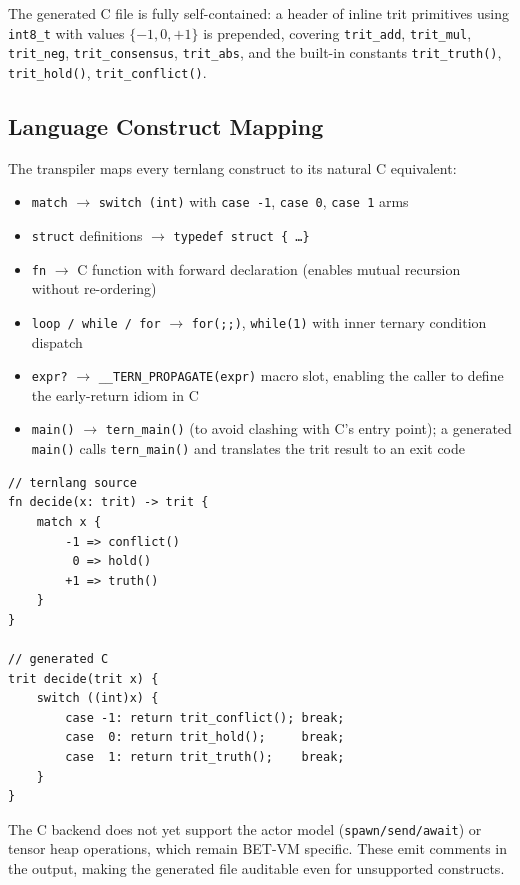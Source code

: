 \documentclass[11pt,a4paper]{article}
\begin{document}
The generated C file is fully self-contained: a header of inline trit
primitives using \texttt{int8\_t} with values $\{-1, 0, +1\}$ is prepended,
covering \texttt{trit\_add}, \texttt{trit\_mul}, \texttt{trit\_neg},
\texttt{trit\_consensus}, \texttt{trit\_abs}, and the built-in constants
\texttt{trit\_truth()}, \texttt{trit\_hold()}, \texttt{trit\_conflict()}.

\subsection{Language Construct Mapping}

The transpiler maps every ternlang construct to its natural C equivalent:

\begin{itemize}
  \item \texttt{match} $\rightarrow$ \texttt{switch (int)} with \texttt{case -1},
        \texttt{case 0}, \texttt{case 1} arms
  \item \texttt{struct} definitions $\rightarrow$ \texttt{typedef struct \{ \ldots \}}
  \item \texttt{fn} $\rightarrow$ C function with forward declaration (enables
        mutual recursion without re-ordering)
  \item \texttt{loop / while / for} $\rightarrow$ \texttt{for(;;)},
        \texttt{while(1)} with inner ternary condition dispatch
  \item \texttt{expr?} $\rightarrow$ \texttt{\_\_TERN\_PROPAGATE(expr)} macro
        slot, enabling the caller to define the early-return idiom in C
  \item \texttt{main()} $\rightarrow$ \texttt{tern\_main()} (to avoid clashing
        with C's entry point); a generated \texttt{main()} calls \texttt{tern\_main()}
        and translates the trit result to an exit code
\end{itemize}

\begin{lstlisting}[caption={Ternlang source and generated C output}]
// ternlang source
fn decide(x: trit) -> trit {
    match x {
        -1 => conflict()
         0 => hold()
        +1 => truth()
    }
}

// generated C
trit decide(trit x) {
    switch ((int)x) {
        case -1: return trit_conflict(); break;
        case  0: return trit_hold();     break;
        case  1: return trit_truth();    break;
    }
}
\end{lstlisting}

The C backend does not yet support the actor model (\texttt{spawn/send/await})
or tensor heap operations, which remain BET-VM specific. These emit comments
in the output, making the generated file auditable even for unsupported constructs.
\end{document}
